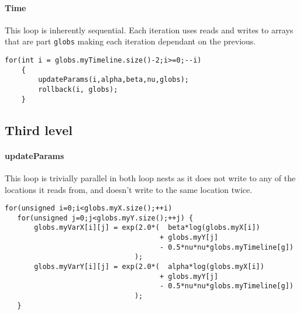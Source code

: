 \paragraph{Time}
This loop is inherently sequential. Each iteration uses reads and writes to arrays that are part \verb!globs! making
 each iteration dependant on the previous.
\begin{lstlisting}[caption=Timeline loop, label=timeloop]
for(int i = globs.myTimeline.size()-2;i>=0;--i)
    {
        updateParams(i,alpha,beta,nu,globs);
        rollback(i, globs);
    }
\end{lstlisting}

\subsection{Third level}

\paragraph{updateParams}
This loop is trivially parallel in both loop nests as it does not write to any of the locations it reads from, and
 doesn't write to the same location twice.
\begin{lstlisting}[caption=Loop in updateParams(), label=updpar]
for(unsigned i=0;i<globs.myX.size();++i)
   for(unsigned j=0;j<globs.myY.size();++j) {
       globs.myVarX[i][j] = exp(2.0*(  beta*log(globs.myX[i])
                                     + globs.myY[j]
                                     - 0.5*nu*nu*globs.myTimeline[g])
                               );
       globs.myVarY[i][j] = exp(2.0*(  alpha*log(globs.myX[i])
                                     + globs.myY[j]
                                     - 0.5*nu*nu*globs.myTimeline[g])
                               );
   }
\end{lstlisting}

